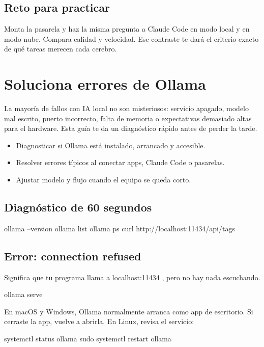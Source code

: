 \documentclass[11pt,a4paper]{book}
\begin{document}
\section{Reto para practicar}
Monta la pasarela y haz la misma pregunta a Claude Code en modo local y en modo nube. Compara calidad y velocidad. Ese contraste te dará el criterio exacto de qué tareas merecen cada cerebro.

\chapter{Soluciona errores de Ollama}
La mayoría de fallos con IA local no son misteriosos: servicio apagado, modelo mal escrito, puerto incorrecto, falta de memoria o expectativas demasiado altas para el hardware. Esta guía te da un diagnóstico rápido antes de perder la tarde.

\begin{itemize}\item Diagnosticar si Ollama está instalado, arrancado y accesible.\end{itemize}
\begin{itemize}\item Resolver errores típicos al conectar apps, Claude Code o pasarelas.\end{itemize}
\begin{itemize}\item Ajustar modelo y flujo cuando el equipo se queda corto.\end{itemize}
\section{Diagnóstico de 60 segundos}
\begin{codebox}
ollama --version
ollama list
ollama ps
curl http://localhost:11434/api/tags
\end{codebox}
\section{Error: connection refused}
Significa que tu programa llama a localhost:11434 , pero no hay nada escuchando.

\begin{codebox}
ollama serve
\end{codebox}
En macOS y Windows, Ollama normalmente arranca como app de escritorio. Si cerraste la app, vuelve a abrirla. En Linux, revisa el servicio:

\begin{codebox}
systemctl status ollama
sudo systemctl restart ollama
\end{codebox}
\end{document}
